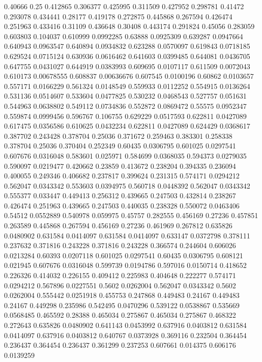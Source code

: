 0.40666 0.25
0.412865 0.306377
0.425995 0.311509
0.427952 0.298781
0.41472 0.293078
0.434441 0.28177
0.419178 0.272875
0.445868 0.267594
0.426474 0.251963
0.433416 0.31109
0.436648 0.30408
0.443174 0.291824
0.45056 0.283059
0.603803 0.104037
0.610999 0.0992285
0.63888 0.0925309
0.639287 0.0947664
0.640943 0.0963547
0.640894 0.0934832
0.623288 0.0570097
0.619843 0.0718185
0.629524 0.0715124
0.630936 0.0616462
0.641603 0.0399485
0.644081 0.0436705
0.647755 0.0431027
0.644919 0.0383993
0.609695 0.0107117
0.611509 0.0072043
0.610173 0.00678555
0.608837 0.00636676
0.607545 0.0100196
0.60862 0.0103657
0.557171 0.0166229
0.561324 0.0148549
0.559933 0.0112252
0.554915 0.0136264
0.531136 0.0514607
0.533604 0.0477825
0.530232 0.0468543
0.527757 0.051631
0.544963 0.0638802
0.549112 0.0734836
0.552872 0.0869472
0.55575 0.0952347
0.559874 0.0999456
0.596767 0.106755
0.629229 0.0517593
0.622811 0.0427089
0.617475 0.0356586
0.610625 0.0432234
0.622811 0.0427089
0.624429 0.0368617
0.387702 0.243428
0.378704 0.25036
0.371672 0.259463
0.383301 0.258338
0.378704 0.25036
0.370404 0.252349
0.60435 0.0306795
0.601025 0.0297541
0.607676 0.0316048
0.583601 0.025971
0.584699 0.0368035
0.594373 0.0279035
0.590097 0.0219477
0.420662 0.23859
0.413672 0.238204
0.394335 0.236094
0.400055 0.249346
0.406682 0.237817
0.399624 0.231315
0.574171 0.0294212
0.562047 0.0343342
0.553603 0.0394975
0.560718 0.0448392
0.562047 0.0343342
0.555377 0.033447
0.449413 0.256312
0.439665 0.247503
0.432814 0.238267
0.426474 0.251963
0.439665 0.247503
0.440035 0.238328
0.550072 0.0463406
0.54512 0.0552889
0.540978 0.059975
0.45757 0.282555
0.456169 0.27236
0.457851 0.263589
0.445868 0.267594
0.456169 0.27236
0.461969 0.267812
0.635826 0.0480902
0.631584 0.0414097
0.631584 0.0414097
0.633147 0.0372798
0.378111 0.237632
0.371816 0.243228
0.371816 0.243228
0.366574 0.244604
0.606026 0.0213284
0.60393 0.0207118
0.601025 0.0297541
0.60435 0.0306795
0.608121 0.021945
0.607676 0.0316048
0.599739 0.0194786
0.597016 0.0150714
0.418652 0.226326
0.414032 0.226155
0.409412 0.225983
0.404648 0.222277
0.574171 0.0294212
0.567896 0.0227551
0.5602 0.0262004
0.562047 0.0343342
0.5602 0.0262004
0.555442 0.0251918
0.455753 0.247868
0.449483 0.24167
0.449483 0.24167
0.449298 0.235986
0.542495 0.0470296
0.539122 0.0538867
0.535669 0.0568485
0.465592 0.28388
0.465034 0.275867
0.465034 0.275867
0.468322 0.272643
0.635826 0.0480902
0.641143 0.0453992
0.637916 0.0403812
0.631584 0.0414097
0.637916 0.0403812
0.640767 0.0373928
0.369116 0.232504
0.364454 0.236437
0.364454 0.236437
0.361299 0.237253
0.607661 0.014375
0.606176 0.0139259
